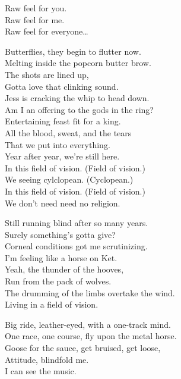 Raw feel for you. \\
Raw feel for me. \\
Raw feel for everyone… \\




Butterflies, they begin to flutter now. \\
Melting inside the popcorn butter brow. \\
The shots are lined up, \\
Gotta love that clinking sound. \\
Jess is cracking the whip to head down. \\

Am I an offering to the gods in the ring? \\
Entertaining feast fit for a king. \\
All the blood, sweat, and the tears \\
That we put into everything. \\
Year after year, we're still here. \\

In this field of vision. (Field of vision.) \\
We seeing cylclopean. (Cyclopean.) \\
In this field of vision. (Field of vision.) \\
We don't need need no religion. \\


Still running blind after so many years. \\
Surely something's gotta give? \\
Corneal conditions got me scrutinizing. \\
I'm feeling like a horse on Ket. \\

Yeah, the thunder of the hooves, \\
Run from the pack of wolves. \\
The drumming of the limbs overtake the wind. \\
Living in a field of vision. \\


Big ride, leather-eyed, with a one-track mind. \\
One race, one course, fly upon the metal horse. \\
Goose for the sauce, get bruised, get loose, \\
Attitude, blindfold me. \\
I can see the music. \\

